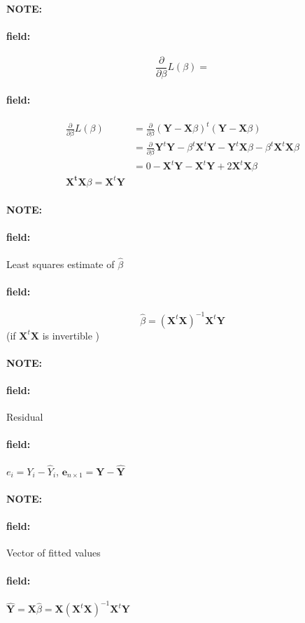 \documentclass[12pt]{article}
\newenvironment{note}{\paragraph{NOTE:}}{}
\newenvironment{field}{\paragraph{field:}}{}
\begin{document}
\begin{note}
  \begin{field}
    $$  \frac{\partial}{\partial \beta} L(\beta) = $$
  \end{field}
  \begin{field}
    \begin{align*}
       \frac{\partial}{\partial \beta} L(\beta)  &= \frac{\partial}{\partial \beta} (\mathbf{Y} - \mathbf{X}\beta)^t(\mathbf{Y} - \mathbf{X}\beta)\\
       &= \frac{\partial}{\partial \beta}  \mathbf{Y}^t \mathbf{Y} - \beta^t \mathbf{X}^t
\textbf{Y} - \mathbf{Y}^t \mathbf{X}\beta - \beta^t \mathbf{X}^t \mathbf{X} \beta \\
&= 0 - \mathbf{X}^t \mathbf{Y} - \mathbf{X}^t \mathbf{Y} + 2 \mathbf{X}^t \mathbf{X} \beta  \\
\mathbf{X^t}\mathbf{X}\beta = \mathbf{X}^t \mathbf{Y}
    \end{align*}
  \end{field}
\end{note}

\begin{note}
  \begin{field}
    Least squares estimate of $\hat{\beta}$
  \end{field}
  \begin{field}
    $$ \hat{\beta} = (\mathbf{X}^t \mathbf{X})^{-1} \mathbf{X}^t \mathbf{Y} $$ (if $\mathbf{X}^t \mathbf{X}$ is invertible )
  \end{field}
\end{note}

\begin{note}
  \begin{field}
    Residual
  \end{field}
  \begin{field}
    $e_i = Y_i - \hat{Y}_i$, $\mathbf{e}_{n\times 1} = \mathbf{Y} - \hat{\mathbf{Y}}$
  \end{field}
\end{note}

\begin{note}
  \begin{field}
    Vector of fitted values
  \end{field}
  \begin{field}
    $\hat{\mathbf{Y}} = \mathbf{X}\hat{\beta} = \mathbf{X} (\mathbf{X}^t \mathbf{X})^{-1} \mathbf{X}^t \mathbf{Y}$
  \end{field}
\end{note}
\end{document}
